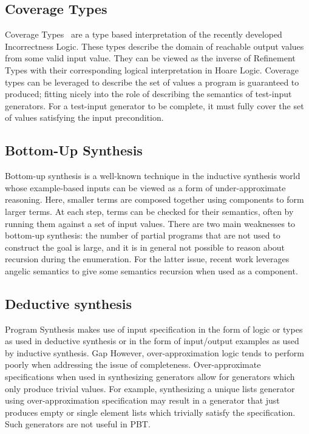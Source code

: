 \documentclass[review, sigplan]{acmart}
\begin{document}
\subsection{Coverage Types}

Coverage Types~\cite{Poirot} are a type based interpretation of the recently developed Incorrectness Logic\citep{IL}.
These types describe the domain of reachable output values from some valid input value.
They can be viewed as the inverse of Refinement Types with their corresponding logical interpretation in Hoare Logic.
Coverage types can be leveraged to describe the set of values a program is
guaranteed to produced; fitting nicely into the role of describing the semantics
of test-input generators. For a test-input generator to be complete, it must
fully cover the set of values satisfying the input precondition.

\subsection{Bottom-Up Synthesis}
Bottom-up synthesis is a well-known technique in the inductive synthesis world
whose example-based inputs can be viewed as a form of under-approximate
reasoning. Here, smaller terms are composed together using components to form
larger terms. At each step, terms can be checked for their semantics, often by
running them against a set of input values. There are two main weaknesses to
bottom-up synthesis: the number of partial programs that are not used to
construct the goal is large, and it is in general not possible to reason about
recursion during the enumeration. For the latter issue, recent work leverages
angelic semantics to give some semantics recursion when used as a component\cite{Burst}.

\subsection{Deductive synthesis}

Program Synthesis makes use of input specification in the form of logic or types as used in deductive synthesis or in the form of input/output examples as used by inductive synthesis.
Gap
However, over-approximation logic tends to perform poorly when addressing the issue of completeness. Over-approximate specifications when used in synthesizing generators allow for generators which only produce trivial values. For example, synthesizing a unique lists generator using over-approximation specification may result in a generator that just produces empty or single element lists which trivially satisfy the specification. Such generators are not useful in PBT.
\end{document}
